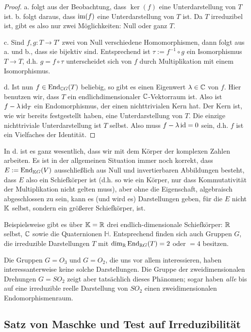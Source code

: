 \begin{proof}
a. folgt aus der Beobachtung, dass $\ker(f)$ eine Unterdarstellung von $T$ ist. b. folgt daraus, dass $\operatorname{im}(f)$ eine Unterdarstellung von $T$ ist. Da $T$ irreduzibel ist, gibt es also nur zwei Möglichkeiten: Null oder ganz $T$.

\smallbreak
c. Sind $f, g: T\to T'$ zwei von Null verschiedene Homomorphismen, dann folgt aus a. und b., dass sie bijektiv sind. Entsprechend ist $\tau:=f^{-1}\circ g$ ein Isomorphismus $T\to T$, d.h. $g=f\circ\tau$ unterscheidet sich von $f$ durch Multiplikation mit einem Isomorphismus.

\smallbreak
d. Ist nun $f\in\operatorname{End}_{\mathbb{C} G}(T)$ beliebig, so gibt es einen Eigenwert $\lambda\in\mathbb{C}$ von $f$. Hier benutzen wir, dass $T$ ein endlichdimensionaler $\mathbb{C}$-Vektorraum ist. Also ist $f-\lambda\operatorname{id}_T$ ein Endomorphismus, der einen nichttrivialen Kern hat. Der Kern ist, wie wir bereits festgestellt haben, eine Unterdarstellung von $T$. Die einzige nichttriviale Unterdarstellung ist $T$ selbst. Also muss $f-\lambda\operatorname{id} = 0$ sein, d.h. $f$ ist ein Vielfaches der Identität.
\end{proof}

\begin{remark}
In d. ist es ganz wesentlich, dass wir mit dem Körper der komplexen Zahlen arbeiten. Es ist in der allgemeinen Situation immer noch korrekt, dass $E:=\operatorname{End}_{\mathbb{K} G}(V)$ ausschließlich aus Null und invertierbaren Abbildungen besteht, dass $E$ also ein Schiefkörper ist (d.h. so wie ein Körper, nur dass Kommutativität der Multiplikation nicht gelten muss), aber ohne die Eigenschaft, algebraisch abgeschlossen zu sein, kann es (und wird es) Darstellungen geben, für die $E$ nicht $\mathbb{K}$ selbst, sondern ein größerer Schiefkörper, ist.

\medbreak
Beispielsweise gibt es über $\mathbb{K}=\mathbb{R}$ drei endlich-dimensionale Schiefkörper: $\mathbb{R}$ selbst, $\mathbb{C}$ sowie die Quaternionen $\mathbb{H}$. Entsprechend finden sich auch Gruppen $G$, die irreduzible Darstellungen $T$ mit $\dim_{\mathbb{R}} \operatorname{End}_{\mathbb{R} G}(T)=2$ oder $=4$ besitzen.

Die Gruppen $G=O_3$ und $G=O_2$, die uns vor allem interessieren, haben interessanterweise keine solche Darstellungen. Die Gruppe der zweidimensionalen Drehungen $G=SO_2$ zeigt aber tatsächlich dieses Phänomen; sogar haben \emph{alle} bis auf eine irreduzible reelle Darstellung von $SO_2$ einen zweidimensionalen Endomorphismenraum.
\end{remark}

\subsection{Satz von Maschke und Test auf Irreduzibilität}

